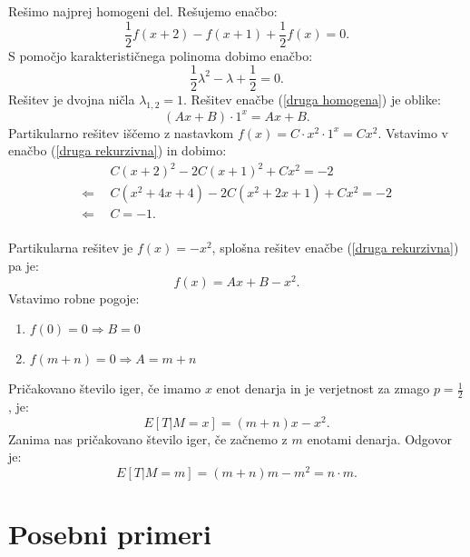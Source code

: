 \documentclass[12pt, a4paper]{article}
\begin{document}
Rešimo najprej homogeni del. Rešujemo enačbo: 
\begin{equation}
\label{druga homogena}
\frac{1}{2}f(x+2)-f(x+1)+\frac{1}{2}f(x)=0.
\end{equation} S pomočjo karakterističnega polinoma dobimo enačbo: 
$$\frac{1}{2}\lambda^2-\lambda+\frac{1}{2}=0.$$
Rešitev je dvojna ničla $\lambda_{1, 2}= 1$. Rešitev enačbe (\ref{druga homogena}) je oblike: $$(Ax+B)\cdot 1^x=Ax+B.$$
Partikularno rešitev iščemo z nastavkom $f(x)=C\cdot x^2\cdot 1^x= Cx^2$. Vstavimo v enačbo (\ref{druga rekurzivna}) in dobimo:
\begin{equation*}
\begin{split}
 & ~~C(x+2)^2-2C(x+1)^2+Cx^2=-2\\
\Leftarrow & ~~C(x^2+4x+4)-2C(x^2+2x+1)+Cx^2=-2\\
\Leftarrow &  ~~C = -1 .\\
\end{split}
\end{equation*}

Partikularna rešitev je $f(x)=-x^2$, splošna rešitev enačbe (\ref{druga rekurzivna}) pa je: $$f(x)=Ax+B-x^2.$$
Vstavimo robne pogoje:
\begin{enumerate}
\item $f(0)=0\Rightarrow B = 0$
\item $f(m+n)=0 \Rightarrow A = m+n$
\end{enumerate}
Pričakovano število iger, če imamo $x$ enot denarja in je verjetnost za zmago $p=\frac{1}{2}$, je: $$E[T|M=x]= (m+n)x-x^2.$$
Zanima nas pričakovano število iger, če začnemo z $m$ enotami denarja. Odgovor je:$$E[T|M=m]=(m+n)m-m^2= n\cdot m.$$

\newpage

\section{Posebni primeri}
\end{document}
